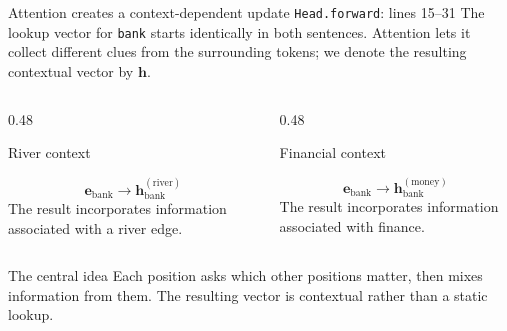 \begin{frame}{Attention creates a context-dependent update
  \hfill{\tiny \texttt{Head.forward}: lines 15--31}}
  \small
  The lookup vector for \texttt{bank} starts identically in both sentences.
  Attention lets it collect different clues from the surrounding tokens; we
  denote the resulting contextual vector by $\mathbf h$.

  \begin{columns}[T]
    \begin{column}{0.48\textwidth}
      \begin{block}{River context}
        \centering

        \[
          \mathbf e_{\text{bank}}
          \longrightarrow
          \mathbf h_{\text{bank}}^{(\text{river})}
        \]
        The result incorporates information associated with a river edge.
      \end{block}
    \end{column}
    \begin{column}{0.48\textwidth}
      \begin{block}{Financial context}
        \centering

        \[
          \mathbf e_{\text{bank}}
          \longrightarrow
          \mathbf h_{\text{bank}}^{(\text{money})}
        \]
        The result incorporates information associated with finance.
      \end{block}
    \end{column}
  \end{columns}

  \vspace{-0.4em}
  \begin{alertblock}{The central idea}
    \footnotesize
    Each position asks which other positions matter, then mixes information
    from them. The resulting vector is contextual rather than a static lookup.
  \end{alertblock}
\end{frame}


